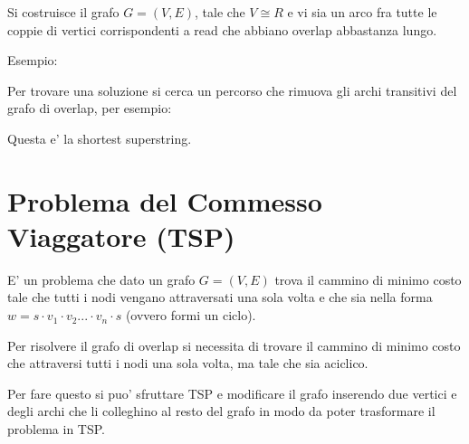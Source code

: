 Si costruisce il grafo $G = (V, E)$, tale che $V \cong R$ e vi sia un arco fra tutte le coppie di vertici corrispondenti a read che abbiano overlap abbastanza lungo.

Esempio:


Per trovare una soluzione si cerca un percorso che rimuova gli archi transitivi del grafo di overlap, per esempio:


Questa e' la shortest superstring.

\section{Problema del Commesso Viaggatore (TSP)}

E' un problema che dato un grafo $G = (V, E)$ trova il cammino di minimo costo tale che tutti i nodi vengano attraversati una sola volta e che sia nella forma $w = s \cdot v_1 \cdot v_2 ... \cdot v_n \cdot s$ (ovvero formi un ciclo).

Per risolvere il grafo di overlap si necessita di trovare il cammino di minimo costo che attraversi tutti i nodi una sola volta, ma tale che sia aciclico.

Per fare questo si puo' sfruttare TSP e modificare il grafo inserendo due vertici e degli archi che li colleghino al resto del grafo in modo da poter trasformare il problema in TSP.

